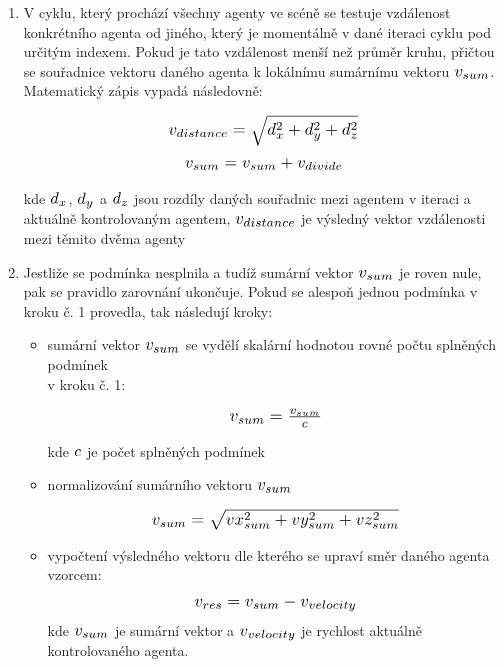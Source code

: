 \documentclass[czech,public,dept460,male,cpdeclaration]{diploma}
\begin{document}
\begin{enumerate}
	\item V cyklu, který prochází všechny agenty ve scéně se testuje vzdálenost konkrétního agenta od jiného, který je momentálně v dané iteraci cyklu pod určitým indexem. Pokud je tato vzdálenost menší než průměr kruhu, přičtou se souřadnice vektoru daného agenta k lokálnímu sumárnímu vektoru \( \scalebox{1.2}{$v_{sum}$} \). Matematický zápis vypadá následovně:
	
		\[ \scalebox{1.2}{$v_{distance} = \sqrt{d_x^2 + d_y^2 + d_z^2}$} \]
		\[ \scalebox{1.2}{$v_{sum} = v_{sum} + v_{divide}$} \]
		
		kde \( \scalebox{1.2}{$d_{x}$} \), \( \scalebox{1.2}{$d_{y}$} \) a \( \scalebox{1.2}{$d_{z}$} \) jsou rozdíly daných souřadnic mezi agentem v iteraci a aktuálně kontrolovaným agentem, \( \scalebox{1.2}{$v_{distance}$} \) je výsledný vektor vzdálenosti mezi těmito dvěma agenty
		
	\item Jestliže se podmínka nesplnila a tudíž sumární vektor \( \scalebox{1.2}{$v_{sum}$} \) je roven nule, pak se pravidlo zarovnání ukončuje. Pokud se alespoň jednou podmínka v kroku č. 1 provedla, tak následují kroky:
	
	\begin{itemize}
		\item sumární vektor \( \scalebox{1.2}{$v_{sum}$} \) se vydělí skalární hodnotou rovné počtu splněných podmínek \\v kroku č. 1:
		
		\[ \scalebox{1.2}{$v_{sum} = \frac{v_{sum}}{c}$} \]
		
		kde \( \scalebox{1.2}{$c$} \) je počet splněných podmínek 
		
		\item normalizování sumárního vektoru \( \scalebox{1.2}{$v_{sum}$} \)
		
		\[ \scalebox{1.2}{$v_{sum} = \sqrt{vx_{sum}^2 + vy_{sum}^2 + vz_{sum}^2}$} \]
		
		\item vypočtení výsledného vektoru dle kterého se upraví směr daného agenta vzorcem: 
		\[ \scalebox{1.2}{$v_{res} = v_{sum} - v_{velocity}$} \]
		kde \( \scalebox{1.2}{$v_{sum}$} \) je sumární vektor a \( \scalebox{1.2}{$v_{velocity}$} \) je rychlost aktuálně kontrolovaného agenta.
	\end{itemize}
	
\end{enumerate}
\end{document}

